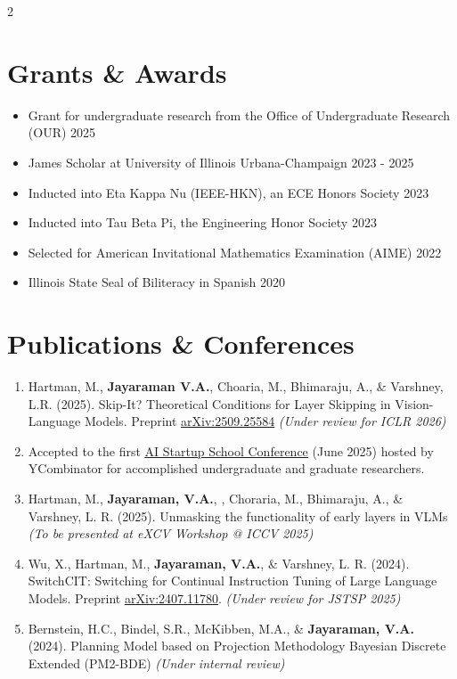 \documentclass[letterpaper,10pt]{article}
\begin{document}
\begin{paracol}{2}
    
    \section{Grants \& Awards}
    \begin{itemize}[itemsep=-3pt, parsep=5pt, leftmargin=0.25in]
        \item Grant for undergraduate research from the Office of Undergraduate Research (OUR) \hfill 2025
        \item James Scholar at University of Illinois Urbana-Champaign \hfill 2023 - 2025
        \item Inducted into Eta Kappa Nu (IEEE-HKN), an ECE Honors Society \hfill 2023
        \item Inducted into Tau Beta Pi, the Engineering Honor Society \hfill 2023
        \item Selected for American Invitational Mathematics Examination (AIME) \hfill 2022
        \item Illinois State Seal of Biliteracy in Spanish \hfill 2020
    \end{itemize}
    
    
    \switchcolumn
    
    
    \section{Publications \& Conferences}
    \begin{enumerate}[leftmargin=0.25in, itemsep=-2pt]
        \item Hartman, M., \textbf{Jayaraman V.A.}, Choaria, M., Bhimaraju, A., \& Varshney, L.R. (2025). Skip-It? Theoretical Conditions for Layer Skipping in Vision-Language Models. Preprint \href{https://www.arxiv.org/abs/2509.25584}{\underline{arXiv:2509.25584}} \textit{(Under review for ICLR 2026)}
        \item Accepted to the first \href{https://events.ycombinator.com/ai-sus}{\underline{AI Startup School Conference}} (June 2025) hosted by YCombinator for accomplished undergraduate and graduate researchers.
        \item Hartman, M., \textbf{Jayaraman, V.A.}, , Choraria, M., Bhimaraju, A., \& Varshney, L. R. (2025). Unmasking the functionality of early layers in VLMs \textit{(To be presented at eXCV Workshop @ ICCV 2025)}
        \item Wu, X., Hartman, M., \textbf{Jayaraman, V.A.}, \& Varshney, L. R. (2024). SwitchCIT: Switching for Continual Instruction Tuning of Large Language Models. Preprint \href{https://arxiv.org/abs/2407.11780}{\underline{arXiv:2407.11780}}. \textit{(Under review for JSTSP 2025)}
        \item Bernstein, H.C., Bindel, S.R., McKibben, M.A., \& \textbf{Jayaraman, V.A.} (2024). Planning Model based on Projection Methodology Bayesian Discrete Extended (PM2-BDE) \textit{(Under internal review)}
    \end{enumerate}
    

\end{paracol}
\end{document}
